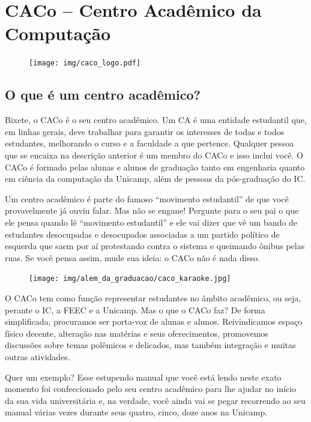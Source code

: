 
\section{CACo -- Centro Acadêmico da Computação}

\begin{figure}[H]
  \centering
  \texttt{[image: img/caco\_logo.pdf]}
\end{figure}

\subsection{O que é um centro acadêmico?}

Bixete, o CACo é o seu centro acadêmico. Um CA é uma entidade estudantil que,
em linhas gerais, deve trabalhar para garantir os interesses de todas e todos
estudantes, melhorando o curso e a faculdade a que pertence. Qualquer pessoa
que se encaixa na descrição anterior é um membro do CACo e isso inclui você.
O CACo é formado pelas alunas e alunos de graduação tanto em engenharia quanto
em ciência da computação da Unicamp, além de pessoas da pós-graduação do IC.

Um centro acadêmico é parte do famoso ``movimento estudantil'' de que você
provavelmente já ouviu falar. Mas não se engane! Pergunte para o seu pai o que
ele pensa quando lê ``movimento estudantil'' e ele vai dizer que vê um bando de
estudantes desocupadas e desocupados associadas a um partido político de
esquerda que saem por aí protestando contra o sistema e queimando ônibus pelas
ruas. Se você pensa assim, mude sua ideia: o CACo não é nada disso.

\begin{figure}[H]
  \centering
  \texttt{[image: img/alem\_da\_graduacao/caco\_karaoke.jpg]}
\end{figure}

O CACo tem como função representar estudantes no âmbito acadêmico, ou seja,
perante o IC, a FEEC e a Unicamp. Mas o que o CACo faz? De forma simplificada,
procuramos ser porta-voz de alunas e alunos. Reivindicamos espaço físico
decente, alteração nas matérias e seus oferecimentos, promovemos discussões
sobre temas polêmicos e delicados, mas também integração e muitas outras
atividades.

Quer um exemplo? Esse estupendo manual que você está lendo neste exato momento
foi confeccionado pelo seu centro acadêmico para lhe ajudar no início da sua
vida universitária e, na verdade, você ainda vai se pegar recorrendo ao seu
manual várias vezes durante seus quatro, cinco, doze anos na Unicamp.

